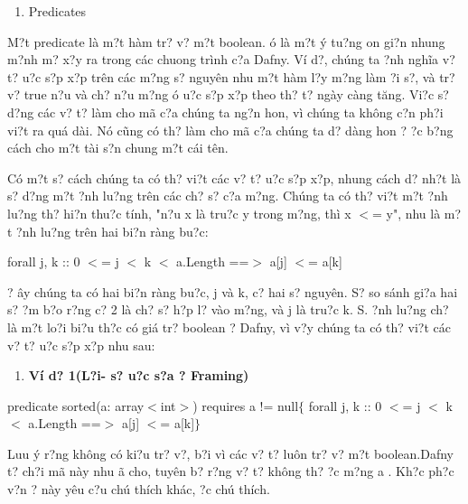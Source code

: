 \documentclass{article} %
\begin{document}
\begin{enumerate}
\item  Predicates\underbar{}
\end{enumerate}

M?t predicate l\`{a} m?t h\`{a}m tr? v? m?t boolean. {\DJ}\'{o} l\`{a} m?t \'{y} tu?ng {\dj}on gi?n nhung m?nh m? x?y ra trong c\'{a}c chuong tr\`{i}nh c?a Dafny. V\'{i} d?, ch\'{u}ng ta {\dj}?nh ngh\~{i}a v? t? {\dj}u?c s?p x?p tr\^{e}n c\'{a}c m?ng s? nguy\^{e}n nhu m?t h\`{a}m l?y m?ng l\`{a}m {\dj}?i s?, v\`{a} tr? v? true n?u v\`{a} ch? n?u m?ng {\dj}\'{o} {\dj}u?c s?p x?p theo th? t? ng\`{a}y c\`{a}ng t\u{a}ng. Vi?c s? d?ng c\'{a}c v? t? l\`{a}m cho m\~{a} c?a ch\'{u}ng ta ng?n hon, v\`{i} ch\'{u}ng ta kh\^{o}ng c?n ph?i vi?t ra qu\'{a} d\`{a}i. N\'{o} c\~{u}ng c\'{o} th? l\`{a}m cho m\~{a} c?a ch\'{u}ng ta d? d\`{a}ng hon {\dj}? {\dj}?c b?ng c\'{a}ch cho m?t t\`{a}i s?n chung m?t c\'{a}i t\^{e}n.

\noindent C\'{o} m?t s? c\'{a}ch ch\'{u}ng ta c\'{o} th? vi?t c\'{a}c v? t? {\dj}u?c s?p x?p, nhung c\'{a}ch d? nh?t l\`{a} s? d?ng m?t {\dj}?nh lu?ng tr\^{e}n c\'{a}c ch? s? c?a m?ng. Ch\'{u}ng ta c\'{o} th? vi?t m?t {\dj}?nh lu?ng th? hi?n thu?c t\'{i}nh, "n?u x l\`{a} tru?c y trong m?ng, th\`{i} x $<$= y", nhu l\`{a} m?t {\dj}?nh lu?ng tr\^{e}n hai bi?n r\`{a}ng bu?c:

\noindent    forall j, k :: 0 $<$= j $<$ k $<$ a.Length ==$>$ a[j] $<$= a[k]

\noindent 

? {\dj}\^{a}y ch\'{u}ng ta c\'{o} hai bi?n r\`{a}ng bu?c, j v\`{a} k, c? hai s? nguy\^{e}n. S? so s\'{a}nh gi?a hai s? {\dj}?m b?o r?ng c? 2 l\`{a} ch? s? h?p l? v\`{a}o m?ng, v\`{a} j l\`{a} tru?c k. S. {\DJ}?nh lu?ng ch? l\`{a} m?t lo?i bi?u th?c c\'{o} gi\'{a} tr? boolean ? Dafny, v\`{i} v?y ch\'{u}ng ta c\'{o} th? vi?t c\'{a}c v? t? {\dj}u?c s?p x?p nhu sau: 

\begin{enumerate}
\item  \textbf{V\'{i} d? 1(L?i- s? {\dj}u?c s?a ? Framing)}
\end{enumerate}

\noindent predicate sorted(a: array$<$int$>$)   requires a != null$\{$   forall j, k :: 0 $<$= j $<$ k $<$ a.Length ==$>$ a[j] $<$= a[k]$\}$

\noindent 

Luu \'{y} r?ng kh\^{o}ng c\'{o} ki?u tr? v?, b?i v\`{i} c\'{a}c v? t? lu\^{o}n tr? v? m?t boolean.Dafny t? ch?i m\~{a} n\`{a}y nhu {\dj}\~{a} cho, tuy\^{e}n b? r?ng v? t? kh\^{o}ng th? {\dj}?c m?ng a . Kh?c ph?c v?n {\dj}? n\`{a}y y\^{e}u c?u ch\'{u} th\'{i}ch kh\'{a}c, {\dj}?c ch\'{u} th\'{i}ch.
\end{document}
